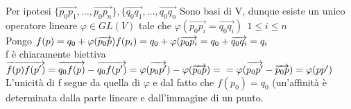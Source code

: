 \documentclass[12px]{article}
\begin{document}
	\begin{dimo}
		Per ipotesi $\{\overrightarrow{p_0p_1},\ldots,\overrightarrow{p_0p_n}\},\{\overrightarrow{q_0q_1}, \ldots, \overrightarrow{q_0q_n}$ Sono basi di V, dunque esiste un unico operatore lineare $\varphi\in GL(V)$ tale che $\varphi(\overrightarrow{p_0p_i} = \overrightarrow{q_0q_i}) \ \ 1\leq i\leq n$ \\
			Pongo	$f(p) = q_0 + \varphi(\overrightarrow{p_0p})\\
			f(p_i) = q_0 + \varphi(\overrightarrow{p_0p_i} = q_0 + \overrightarrow{q_0q_i} = q_i$ \\ 
			f è chiaramente biettiva
			$\overrightarrow{f(p)f(p')} = \overrightarrow{q_0f(p)} - \overrightarrow{q_0f(p')} = \varphi(\overrightarrow{p_0p'}) - \varphi(\overrightarrow{p_0p}) = \\= \varphi(\overrightarrow{p_0p'} - \overrightarrow{p_0p}) = \varphi(pp')$ \\
			L'unicità di f segue da quella di $\varphi$ e dal fatto che $f(p_0) = q_0$ (un'affinità è determinata dalla parte lineare e dall'immagine di un punto.
	\end{dimo}
	\newpage
\end{document}
